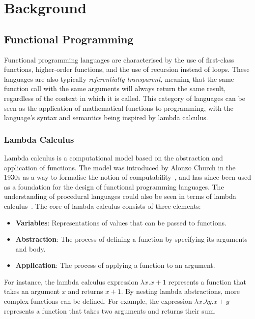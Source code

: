 \chapter{Background}
\label{ch:background}

\section{Functional Programming}

Functional programming languages are characterised by the use of first-class functions, higher-order
functions, and the use of recursion instead of loops. These languages are also typically
\emph{referentially transparent}, meaning that the same function call with the same arguments will
always return the same result, regardless of the context in which it is called. This category
of languages can be seen as the application of mathematical functions to programming, with the
language's syntax and semantics being inspired by lambda calculus.

\subsection{Lambda Calculus}

Lambda calculus is a computational model based on the abstraction and application of functions. The
model was introduced by Alonzo Church in the 1930s as a way to formalise the notion of
computability~\autocite{church1936lambda}, and has since been used as a foundation for the design of
functional programming languages. The understanding of procedural languages could also be seen in
terms of lambda calculus~\autocite{landin1965lambda}. The core of lambda calculus consists of three
elements:

\begin{itemize}
    \onehalfspacing
    \item \textbf{Variables}: Representations of values that can be passed to functions.
    \item \textbf{Abstraction}: The process of defining a function by specifying its arguments and
          body.
    \item \textbf{Application}: The process of applying a function to an argument.
\end{itemize}

For instance, the lambda calculus expression \(\lambda x. x + 1\) represents a function that takes
an argument \(x\) and returns \(x + 1\). By nesting lambda abstractions, more complex functions can
be defined. For example, the expression \(\lambda x. \lambda y. x + y\) represents a function that
takes two arguments and returns their sum.

